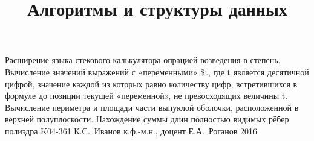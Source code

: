 \documentclass[a4paper,12pt]{memoir}
\def\+{\hskip 0.15mm}
\begin{document}
\renewcommand{\contentsname}{{\Large{Содержание}\hfill}}

\title{Алгоритмы и структуры данных}
{Расширение языка стекового калькулятора опрацией возведения в степень.
Вычисление значений выражений с «переменными» \$t, где t является десятичной
цифрой, значение каждой из которых равно количеству цифр, встретившихся в
формуле до позиции текущей «переменной», не превосходящих величины t.
Вычисление периметра и площади части выпуклой оболочки, расположенной в
верхней полуплоскости. Нахождение суммы длин полностью видимых рёбер полиэдра}
{K04-361}
{К.\+С.~Иванов}
{к.ф.-м.н., доцент}
{Е.\+А.~Роганов}
{2016}








\newpage


\end{document}
